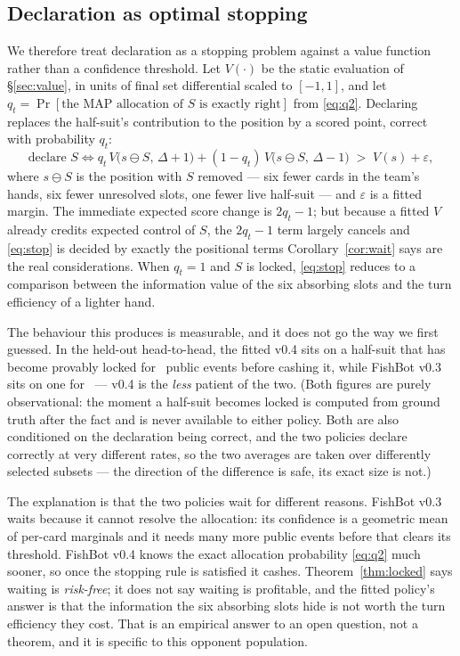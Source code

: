 \subsection{Declaration as optimal stopping}

We therefore treat declaration as a stopping problem against a value function
rather than a confidence threshold. Let $V(\cdot)$ be the static evaluation of
\S\ref{sec:value}, in units of final set differential scaled to $[-1,1]$, and let
$q_t = \Pr[\text{the MAP allocation of } S \text{ is exactly right}]$ from
\eqref{eq:q2}. Declaring replaces the half-suit's contribution to the position
by a scored point, correct with probability $q_t$:
\begin{equation}
  \text{declare } S \iff
  q_t\, V\bigl(s \ominus S,\, \Delta{+}1\bigr) + (1 - q_t)\, V\bigl(s \ominus S,\, \Delta{-}1\bigr)
  \;>\; V(s) + \varepsilon,
  \label{eq:stop}
\end{equation}
where $s \ominus S$ is the position with $S$ removed --- six fewer cards in the
team's hands, six fewer unresolved slots, one fewer live half-suit --- and
$\varepsilon$ is a fitted margin. The immediate expected score change is
$2q_t - 1$; but because a fitted $V$ already credits expected control of $S$, the
$2q_t - 1$ term largely cancels and \eqref{eq:stop} is decided by exactly the
positional terms Corollary~\ref{cor:wait} says are the real considerations. When
$q_t = 1$ and $S$ is locked, \eqref{eq:stop} reduces to a comparison between the
information value of the six absorbing slots and the turn efficiency of a
lighter hand.

The behaviour this produces is measurable, and it does not go the way we first
guessed. In the held-out head-to-head, the fitted v0.4 sits on a half-suit that
has become provably locked for \numLockHoldFour\ public events before cashing
it, while FishBot v0.3 sits on one for \numLockHoldThree\ --- v0.4 is the
\emph{less} patient of the two. (Both figures are purely observational: the
moment a half-suit becomes locked is computed from ground truth after the fact
and is never available to either policy. Both are also conditioned on the
declaration being correct, and the two policies declare correctly at very
different rates, so the two averages are taken over differently selected
subsets --- the direction of the difference is safe, its exact size is not.)

The explanation is that the two policies wait for different reasons. FishBot
v0.3 waits because it cannot resolve the allocation: its confidence is a
geometric mean of per-card marginals and it needs many more public events before
that clears its threshold. FishBot v0.4 knows the exact allocation probability
\eqref{eq:q2} much sooner, so once the stopping rule is satisfied it cashes.
Theorem~\ref{thm:locked} says waiting is \emph{risk-free}; it does not say
waiting is profitable, and the fitted policy's answer is that the information the
six absorbing slots hide is not worth the turn efficiency they cost. That is an
empirical answer to an open question, not a theorem, and it is specific to this
opponent population.

